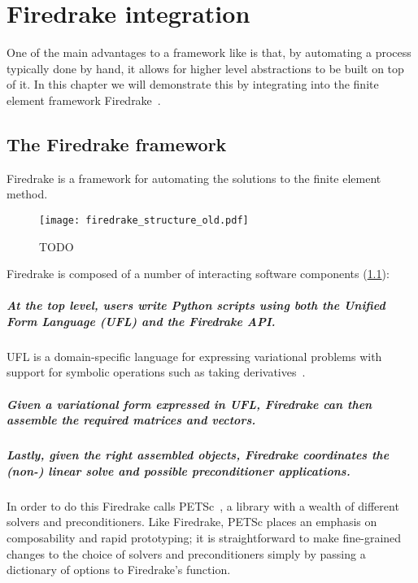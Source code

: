 \documentclass[thesis]{subfiles}
\begin{document}
\chapter{Firedrake integration}

One of the main advantages to a framework like  is that, by automating a process typically done by hand, it allows for higher level abstractions to be built on top of it.
In this chapter we will demonstrate this by integrating  into the finite element framework Firedrake~\cite{FiredrakeUserManual}.

\section{The Firedrake framework}

Firedrake is a framework for automating the solutions to the finite element method.

\begin{figure}
  \texttt{[image: firedrake\_structure\_old.pdf]}
  \caption{TODO}
  \label{fig:firedrake_structure_old}
\end{figure}

Firedrake is composed of a number of interacting software components (\cref{fig:firedrake_structure_old}):

\paragraph{At the top level, users write Python scripts using both the Unified Form Language (UFL) and the Firedrake API.}
UFL is a domain-specific language for expressing variational problems with support for symbolic operations such as taking derivatives~\cite{alnaesUnifiedFormLanguage2014a}.

\paragraph{Given a variational form expressed in UFL, Firedrake can then assemble the required matrices and vectors.}

\paragraph{Lastly, given the right assembled objects, Firedrake coordinates the (non-) linear solve and possible preconditioner applications.}
In order to do this Firedrake calls PETSc~\cite{petsc-user-ref,petsc-web-page,petsc-efficient}, a library with a wealth of different solvers and preconditioners.
Like Firedrake, PETSc places an emphasis on composability and rapid prototyping; it is straightforward to make fine-grained changes to the choice of solvers and preconditioners simply by passing a dictionary of options to Firedrake's  function.
\end{document}
